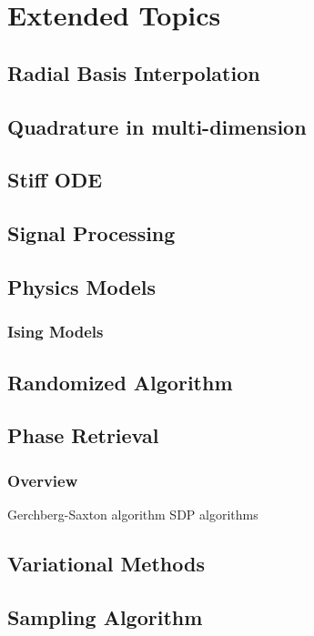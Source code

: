 \chapter{Extended Topics}

\section{Radial Basis Interpolation}

\section{Quadrature in multi-dimension}

\section{Stiff ODE}
\section{Signal Processing}
\section{Physics Models}
\subsection{Ising Models}

\section{Randomized Algorithm}

\section{Phase Retrieval}

\subsection{Overview}
Gerchberg-Saxton algorithm
SDP algorithms

\section{Variational Methods}

\section{Sampling Algorithm}

